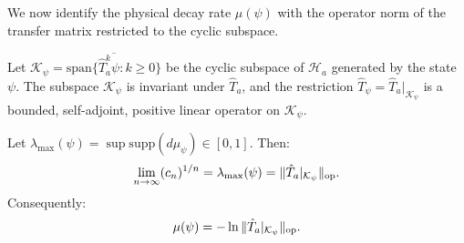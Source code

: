 We now identify the physical decay rate $\mu(\psi)$ with the operator norm of the transfer matrix restricted to the cyclic subspace.

Let $\mathcal{K}_\psi = \overline{\mathrm{span}\{\hat{T}_a^k \psi : k \ge 0\}}$ be the cyclic subspace of $\mathcal{H}_a$ generated by the state $\psi$. The subspace $\mathcal{K}_\psi$ is invariant under $\hat{T}_a$, and the restriction $\hat{T}_\psi = \hat{T}_a|_{\mathcal{K}_\psi}$ is a bounded, self-adjoint, positive linear operator on $\mathcal{K}_\psi$.

\begin{proposition}
\label{prop:spectral_radius_identity}
Let $\lambda_{\max}(\psi) = \sup \mathrm{supp}(d\mu_\psi) \in [0, 1]$. Then:
\begin{equation}
\label{eq:ch9_spectral_radius_formula}
\lim_{n \to \infty} (c_n)^{1/n} = \lambda_{\max}(\psi) = \|\hat{T}_a|_{\mathcal{K}_\psi}\|_{\mathrm{op}}.
\end{equation}
Consequently:
\begin{equation}
\label{eq:ch9_mu_operator_norm}
\mu(\psi) = -\ln \|\hat{T}_a|_{\mathcal{K}_\psi}\|_{\mathrm{op}}.
\end{equation}
\end{proposition}

